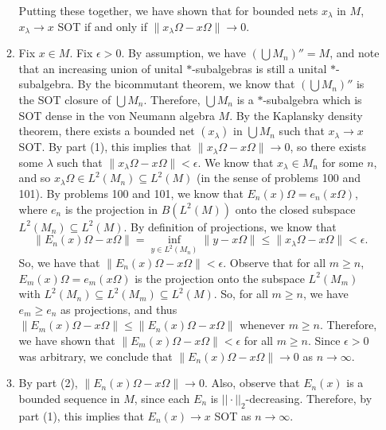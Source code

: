 \documentclass[a4paper,10pt]{report}
\newcommand{\pn}[2]{||#1||_{#2}}
\begin{document}
\begin{enumerate}
\begin{enumerate}
			\newline
			\newline Putting these together, we have shown that for bounded nets $x_\lambda$ in $M$, $x_\lambda \rightarrow x$ SOT if and only if $\|x_\lambda \Omega - x\Omega\| \rightarrow 0$.
			\item Fix $x\in M$.  Fix $\epsilon > 0$.  By assumption, we have $(\bigcup{M_n})'' = M$, and note that an increasing union of unital $*$-subalgebras is still a unital $*$-subalgebra. 
				By the bicommutant theorem, we know that $(\bigcup{M_n})''$ is the SOT closure of $\bigcup{M_n}$.  Therefore, $\bigcup{M_n}$ is a $*$-subalgebra which is SOT dense in the von Neumann algebra $M$. By the Kaplansky density theorem, there exists a bounded net $(x_\lambda)$ in $\bigcup{M_n}$ such that $x_\lambda \rightarrow x$ SOT.  By part (1), this implies that $\|x_\lambda \Omega - x\Omega\| \rightarrow 0$, so there exists some $\lambda$ such that $\|x_\lambda \Omega - x\Omega\| < \epsilon$.  We know that $x_\lambda \in M_n$ for some $n$, and so $x_\lambda \Omega \in L^2(M_n) \subseteq L^2(M)$ (in the sense of problems 100 and 101).  By problems 100 and 101, we know that $E_n(x)\Omega = e_n (x\Omega)$, where $e_n$ is the projection in $B(L^2(M))$ onto the closed subspace $L^2(M_n)\subseteq L^2(M)$. By definition of projections, we know that $$\|E_n(x)\Omega - x\Omega \| = \inf_{y\in L^2(M_n)}{\|y - x\Omega\|} \leq \|x_\lambda \Omega - x\Omega\| < \epsilon.$$ So, we have that $\|E_n(x)\Omega - x\Omega \| < \epsilon$.  Observe that for all $m\geq n$, $E_m(x)\Omega = e_m(x\Omega)$ is the projection onto the subspace $L^2(M_m)$ with $L^2(M_n)\subseteq L^2(M_m)\subseteq L^2(M)$.  So, for all $m\geq n$, we have $e_m\geq e_n$ as projections, and thus $\|E_m(x)\Omega - x\Omega \| \leq \|E_n(x)\Omega - x\Omega \|$ whenever $m\geq n$.  Therefore, we have shown that $\|E_m(x)\Omega - x\Omega \| < \epsilon$ for all $m\geq n$.  Since $\epsilon > 0$ was arbitrary, we conclude that $\|E_n(x)\Omega - x\Omega\| \rightarrow 0$ as $n\rightarrow \infty$.
			\item By part (2), $\|E_n(x)\Omega - x\Omega\| \rightarrow 0$.  Also, observe that $E_n(x)$ is a bounded sequence in $M$, 
				since each $E_n$ is $\pn{\cdot}{2}$-decreasing. 
				Therefore, by part (1), this implies that $E_n(x) \rightarrow x$ SOT as $n\rightarrow \infty$.
		\end{enumerate}
\end{enumerate}
\end{document}
